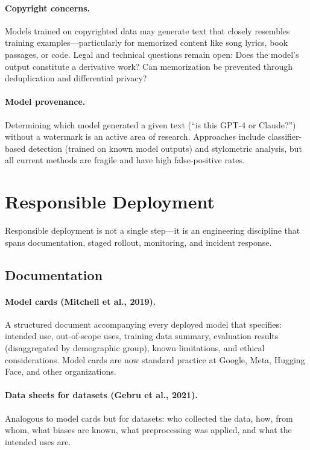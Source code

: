 \paragraph{Copyright concerns.}
Models trained on copyrighted data may generate text that closely resembles
training examples---particularly for memorized content like song lyrics, book
passages, or code.  Legal and technical questions remain open: Does the model's
output constitute a derivative work?  Can memorization be prevented through
deduplication and differential privacy?

\paragraph{Model provenance.}
Determining which model generated a given text (``is this GPT-4 or Claude?'')
without a watermark is an active area of research.  Approaches include
classifier-based detection (trained on known model outputs) and stylometric
analysis, but all current methods are fragile and have high false-positive
rates.

\section{Responsible Deployment}
\label{sec:responsible_deployment}

Responsible deployment is not a single step---it is an engineering discipline
that spans documentation, staged rollout, monitoring, and incident response.

\subsection{Documentation}

\paragraph{Model cards (Mitchell et al., 2019).}
A structured document accompanying every deployed model that specifies:
intended use, out-of-scope uses, training data summary, evaluation results
(disaggregated by demographic group), known limitations, and ethical
considerations.  Model cards are now standard practice at Google, Meta,
Hugging Face, and other organizations.

\paragraph{Data sheets for datasets (Gebru et al., 2021).}
Analogous to model cards but for datasets: who collected the data, how, from
whom, what biases are known, what preprocessing was applied, and what the
intended uses are.

